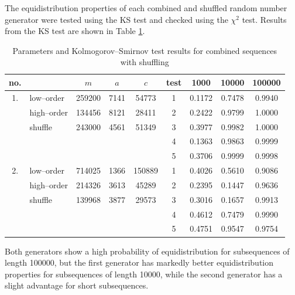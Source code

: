 \documentclass[dvips]{article}
\begin{document}
The equidistribution properties of each combined and shuffled random
number generator
were tested using the KS test and checked using the $\chi^{2}$
test.  Results from the KS test are shown in Table \ref{tabKScombo}.
\begin{table}[htbp]
\centering
\begin{tabular}{|c||l|c|c|c||c|c|c|c|} \hline
no. & &  $m$ & $a$ & $c$ & test & 1000 & 10000 & 100000\\ \hline
1. & low--order     & 259200 & 7141 & 54773   & 1 & 0.1172 & 0.7478 & 0.9940 \\ 
   & high--order    & 134456 & 8121 & 28411   & 2 & 0.2422 & 0.9799 & 1.0000 \\ 
   & shuffle       & 243000 & 4561 & 51349   & 3 & 0.3977 & 0.9982 & 1.0000 \\
   &               &        &      &         & 4 & 0.1363 & 0.9863 & 0.9999 \\ 
   &               &        &      &         & 5 & 0.3706 & 0.9999 & 0.9998 \\ \hline
2. & low--order     & 714025 & 1366 & 150889  & 1 & 0.4026 & 0.5610 & 0.9086 \\
   & high--order    & 214326 & 3613 & 45289   & 2 & 0.2395 & 0.1447 & 0.9636 \\
   & shuffle       & 139968 & 3877 & 29573   & 3 & 0.3016 & 0.1657 & 0.9913 \\
   &               &        &      &         & 4 & 0.4612 & 0.7479 & 0.9990 \\
   &               &        &      &         & 5 & 0.4751 & 0.9547 & 0.9754 \\ \hline
\end{tabular}
\caption{Parameters and Kolmogorov--Smirnov test results for combined
sequences with shuffling}
\label{tabKScombo}
\end{table}
Both generators show a high probability of equidistribution for subsequences of
length 100000, but the first generator has markedly better equidistribution
properties for subsequences of length 10000, while the second generator
has a slight advantage for short subsequences.
 
\end{document}
